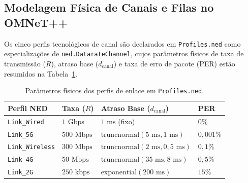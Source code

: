 \documentclass[10pt,twocolumn,a4paper]{article}
\begin{document}
\subsection{Modelagem Física de Canais e Filas no OMNeT++}

Os cinco perfis tecnológicos de canal são declarados em \texttt{Profiles.ned} como especializações de \texttt{ned.DatarateChannel}, cujos parâmetros físicos de taxa de transmissão ($R$), atraso base ($d_{\text{canal}}$) e taxa de erro de pacote (PER) estão resumidos na Tabela~\ref{tab:perfis_enlace}.

\begin{table}[H]
\centering
\caption{Parâmetros físicos dos perfis de enlace em \texttt{Profiles.ned}.}
\label{tab:perfis_enlace}
\footnotesize
\begin{tabularx}{\columnwidth}{@{}lXll@{}}
\toprule
\textbf{Perfil NED} & \textbf{Taxa ($R$)} & \textbf{Atraso Base ($d_{\text{canal}}$)} & \textbf{PER} \\
\midrule
\texttt{Link\_Wired} & $1\text{ Gbps}$ & $1\text{ ms}$ (fixo) & $0\%$ \\
\texttt{Link\_5G} & $500\text{ Mbps}$ & $\text{truncnormal}(5\text{ ms}, 1\text{ ms})$ & $0{,}001\%$ \\
\texttt{Link\_Wireless} & $300\text{ Mbps}$ & $\text{truncnormal}(2\text{ ms}, 0{,}5\text{ ms})$ & $0{,}1\%$ \\
\texttt{Link\_4G} & $50\text{ Mbps}$ & $\text{truncnormal}(35\text{ ms}, 8\text{ ms})$ & $0{,}5\%$ \\
\texttt{Link\_2G} & $250\text{ kbps}$ & $\text{exponential}(200\text{ ms})$ & $15\%$ \\
\bottomrule
\end{tabularx}
\end{table}
\end{document}
